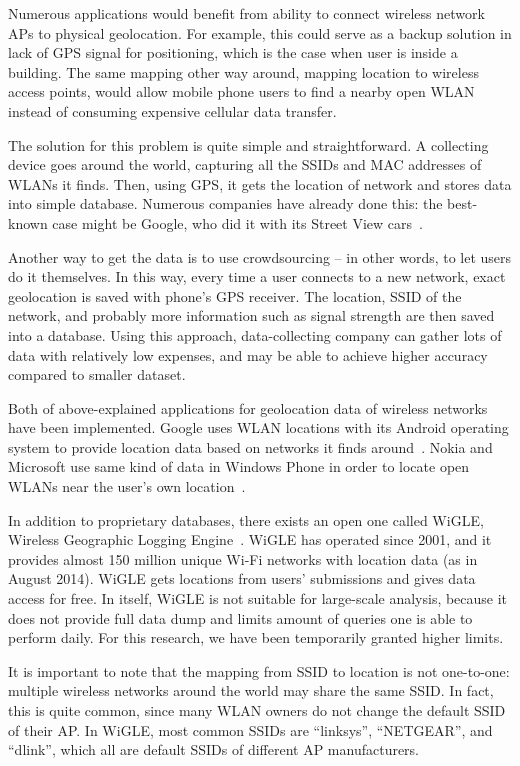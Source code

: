 \documentclass[12pt,a4paper,oneside,pdftex]{report}
\begin{document}
Numerous applications would benefit from ability to connect wireless network APs to physical geolocation. For example, this could serve as a backup solution in lack of GPS signal for positioning, which is the case when user is inside a building. The same mapping other way around, mapping location to wireless access points, would allow mobile phone users to find a nearby open WLAN instead of consuming expensive cellular data transfer.

The solution for this problem is quite simple and straightforward. A collecting device goes around the world, capturing all the SSIDs and MAC addresses of WLANs it finds. Then, using GPS, it gets the location of network and stores data into simple database. Numerous companies have already done this: the best-known case might be Google, who did it with its Street View cars~\cite{google_wifi_collection}. 

Another way to get the data is to use crowdsourcing -- in other words, to let users do it themselves. In this way, every time a user connects to a new network, exact geolocation is saved with phone's GPS receiver. The location, SSID of the network, and probably more information such as signal strength are then saved into a database. Using this approach, data-collecting company can gather lots of data with relatively low expenses, and may be able to achieve higher accuracy compared to smaller dataset.

Both of above-explained applications for geolocation data of wireless networks have been implemented. Google uses WLAN locations with its Android operating system to provide location data based on networks it finds around~\cite{google_wifi_collection}. Nokia and Microsoft use same kind of data in Windows Phone in order to locate open WLANs near the user's own location~\cite{nokia_datasense}.

In addition to proprietary databases, there exists an open one called WiGLE, Wireless Geographic Logging Engine~\cite{wigle}. WiGLE has operated since 2001, and it provides almost 150 million unique Wi-Fi networks with location data (as in August 2014). WiGLE gets locations from users' submissions and gives data access for free. In itself, WiGLE is not suitable for large-scale analysis, because it does not provide full data dump and limits amount of queries one is able to perform daily. For this research, we have been temporarily granted higher limits.

It is important to note that the mapping from SSID to location is not one-to-one: multiple wireless networks around the world may share the same SSID. In fact, this is quite common, since many WLAN owners do not change the default SSID of their AP. In WiGLE, most common SSIDs are ``linksys'', ``NETGEAR'', and ``dlink'', which all are default SSIDs of different AP manufacturers.
\end{document}
